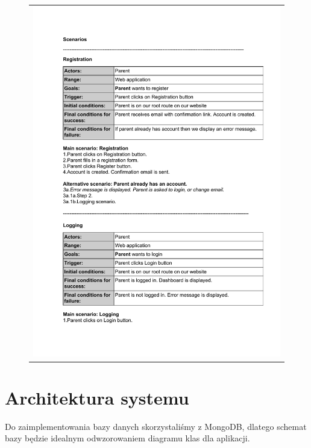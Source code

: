 \documentclass{sprawozdanie-agh}
\begin{document}
		\begin{figure}[H] 
			\centering
			\begin{tabular}{c}
				\includegraphics[page=6, width=.95\textwidth]{scenarios} 
			\end{tabular} 
		\end{figure}
		

	\section{Architektura systemu}
		Do zaimplementowania bazy danych skorzystaliśmy z MongoDB, dlatego schemat bazy będzie idealnym odwzorowaniem diagramu klas dla aplikacji.
		
\end{document}
